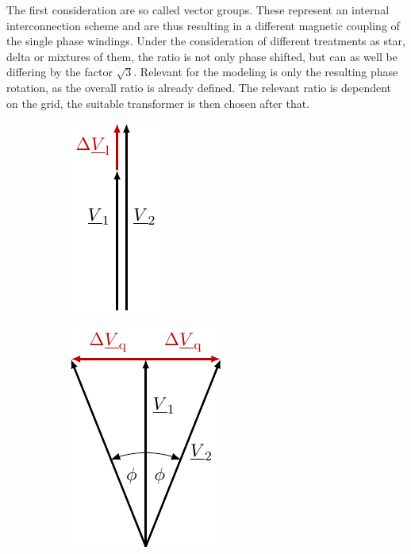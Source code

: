 The first consideration are so called vector groups.
These represent an internal interconnection scheme and are thus resulting in a different magnetic coupling of the single phase windings.
Under the consideration of different treatments as star, delta or mixtures of them, the ratio is not only phase shifted, but can as well be differing by the factor $\sqrt{3}$. 
Relevant for the modeling is only the resulting phase rotation, as the overall ratio is already defined.
The relevant ratio is dependent on the grid, the suitable transformer is then chosen after that.

\begin{figure}[htb!]
        \centering
        \begin{subfigure}[b]{0.29\linewidth}
            \centering
            \includegraphics{tikz_graphics/images/vectors_normal.pdf}
        \end{subfigure}
        \begin{subfigure}[b]{0.29\linewidth}
            \centering
            \includegraphics{tikz_graphics/images/vectors_phase_shifter.pdf}

\end{subfigure}
\end{figure}
